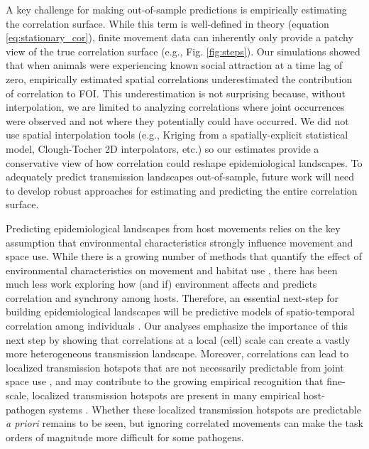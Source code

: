 \documentclass[letterpaper]{article}
\begin{document}
A key challenge for making out-of-sample predictions is empirically estimating the correlation surface.  While this term is well-defined in theory (equation \ref{eq:stationary_cor}), finite movement data can inherently only provide a patchy view of the true correlation surface (e.g., Fig. \ref{fig:steps}).  Our simulations showed that when animals were experiencing known social attraction at a time lag of zero, empirically estimated spatial correlations underestimated the contribution of correlation to FOI. This underestimation is not surprising because, without interpolation, we are limited to analyzing correlations where joint occurrences were observed and not where they potentially could have occurred. We did not use spatial interpolation tools (e.g., Kriging from a spatially-explicit statistical model, Clough-Tocher 2D interpolators, etc.) so our estimates provide a conservative view of how correlation could reshape epidemiological landscapes.  To adequately predict transmission landscapes out-of-sample, future work will need to develop robust approaches for estimating and predicting the entire correlation surface. 

Predicting epidemiological landscapes from host movements relies on the key assumption that environmental characteristics strongly influence movement and space use. While there is a growing number of methods that quantify the effect of environmental characteristics on movement and habitat use \citep[reviewed in][]{Hooten2017a}, there has been much less work exploring how (and if) environment affects and predicts correlation and synchrony among hosts.  Therefore, an essential next-step for building epidemiological landscapes will be predictive models of spatio-temporal correlation among individuals \citep[e.g.][]{Brandell2021}.
Our analyses emphasize the importance of this next step by showing that correlations at a local (cell) scale can create a vastly more heterogeneous transmission landscape. Moreover, correlations can lead to localized transmission hotspots that are not necessarily predictable from joint space use \citep{Yang2023a}, and may contribute to the growing empirical recognition that fine-scale, localized transmission hotspots are present in many empirical host-pathogen systems \citep{Albery2021}.  Whether these localized transmission hotspots are predictable \emph{a priori} remains to be seen, but ignoring correlated movements can make the task orders of magnitude more difficult for some pathogens.


\clearpage
\end{document}
